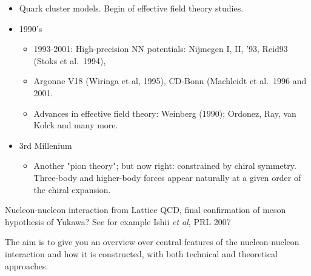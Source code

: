 \documentclass[graybox,sectrefs,envcountresetchap,open=right]{svmonodo}
\begin{document}
\begin{itemize}
\begin{itemize}
\end{itemize}

\noindent
\item Quark cluster models. Begin of effective field theory studies.

\item 1990's
\begin{itemize}

  \item 1993-2001: High-precision NN potentials: Nijmegen I, II, '93, Reid93 (Stoks et al.~1994), 

  \item Argonne V18 (Wiringa et al, 1995), CD-Bonn (Machleidt et al.~1996 and 2001. 

  \item Advances in effective field theory: Weinberg (1990); Ordonez, Ray, van Kolck and many more.

\end{itemize}

\noindent
\item 3rd Millenium
\begin{itemize}

  \item Another "pion theory"; but now right: constrained by chiral symmetry. Three-body and higher-body forces appear naturally at a given order of the chiral expansion. 
\end{itemize}

\noindent
\end{itemize}

\noindent
Nucleon-nucleon interaction from Lattice QCD, final confirmation of meson hypothesis of Yukawa?  See for example Ishii \emph{et al}, PRL 2007

The aim is to give you an overview over central features of the nucleon-nucleon interaction and how it is constructed, with both technical and theoretical approaches. 
\end{document}
